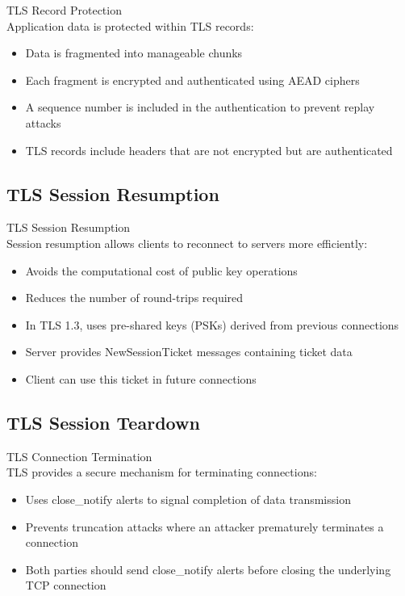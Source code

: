 \begin{concept}{TLS Record Protection}\\
Application data is protected within TLS records:
\begin{itemize}
    \item Data is fragmented into manageable chunks
    \item Each fragment is encrypted and authenticated using AEAD ciphers
    \item A sequence number is included in the authentication to prevent replay attacks
    \item TLS records include headers that are not encrypted but are authenticated
\end{itemize}
\end{concept}

\subsection{TLS Session Resumption}

\begin{definition}{TLS Session Resumption}\\
Session resumption allows clients to reconnect to servers more efficiently:
\begin{itemize}
    \item Avoids the computational cost of public key operations
    \item Reduces the number of round-trips required
    \item In TLS 1.3, uses pre-shared keys (PSKs) derived from previous connections
    \item Server provides NewSessionTicket messages containing ticket data
    \item Client can use this ticket in future connections
\end{itemize}
\end{definition}

\subsection{TLS Session Teardown}

\begin{concept}{TLS Connection Termination}\\
TLS provides a secure mechanism for terminating connections:
\begin{itemize}
    \item Uses close\_notify alerts to signal completion of data transmission
    \item Prevents truncation attacks where an attacker prematurely terminates a connection
    \item Both parties should send close\_notify alerts before closing the underlying TCP connection
\end{itemize}
\end{concept}

